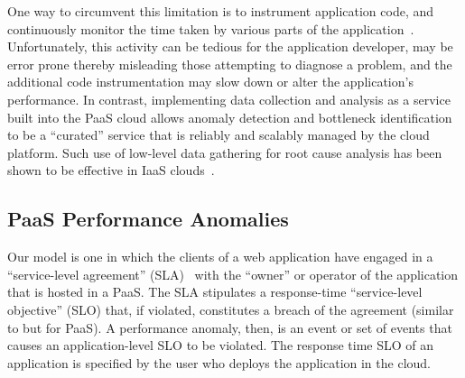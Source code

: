 One way to circumvent this 
limitation is to instrument application code, and continuously monitor the time taken by various
parts of the application~\cite{newrelic,datadog,dynatrace}. 
Unfortunately, this activity can be tedious for the application developer, 
may be error prone thereby misleading those attempting to
diagnose a problem, and
the additional code instrumentation may slow down or alter the application's
performance. 
In contrast, implementing data collection and analysis as a service built into the PaaS cloud allows 
anomaly detection and bottleneck identification to be a ``curated'' service that is 
reliably and scalably managed by the cloud platform. Such use of low-level data gathering
for root cause analysis has been shown to be effective in IaaS clouds~\cite{Dean:2014:PTR:2696535.2696551}.

\subsection{PaaS Performance Anomalies}


Our model is
one in which the clients of a web application have engaged in a
``service-level agreement'' (SLA)~\cite{Keller:2003:WFS:635430.635442}
with the ``owner'' or operator of the application that is hosted in a PaaS.  The SLA
stipulates a response-time ``service-level objective'' (SLO) that, if violated, constitutes a breach of the
agreement (similar to \cite{Nguyen:2011:PPR:2038633.2038634} but for PaaS).  
A performance anomaly, then, is an event or set of events that
causes an application-level SLO to be violated. The response time SLO of an application
is specified by the user who deploys the application in the cloud.

